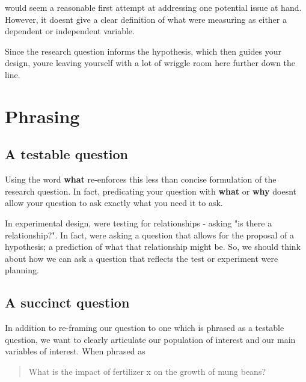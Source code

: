 \documentclass[
]{book}
\begin{document}
would seem a reasonable first attempt at addressing one potential issue at hand. However, it doesn\textquotesingle t give a clear definition of what we\textquotesingle re measuring as either a dependent or independent variable.

Since the research question informs the hypothesis, which then guides your design, you\textquotesingle re leaving yourself with a lot of wriggle room here further down the line.

\hypertarget{phrasing}{%
\section*{Phrasing}\label{phrasing}}

\hypertarget{a-testable-question}{%
\subsection*{A testable question}\label{a-testable-question}}

Using the word \textbf{what} re-enforces this less than concise formulation of the research question. In fact, predicating your question with \textbf{what} or \textbf{why} doesn\textquotesingle t allow your question to ask exactly what you need it to ask.

In experimental design, we\textquotesingle re testing for relationships - asking "is there a relationship?". In fact, we\textquotesingle re asking a question that allows for the proposal of a hypothesis; a prediction of what that relationship might be. So, we should think about how we can ask a question that reflects the test or experiment we\textquotesingle re planning.

\hypertarget{a-succinct-question}{%
\subsection*{A succinct question}\label{a-succinct-question}}

In addition to re-framing our question to one which is phrased as a testable question, we want to clearly articulate our population of interest and our main variables of interest. When phrased as

\begin{quote}
What is the impact of fertilizer x on the growth of mung beans?
\end{quote}
\end{document}
